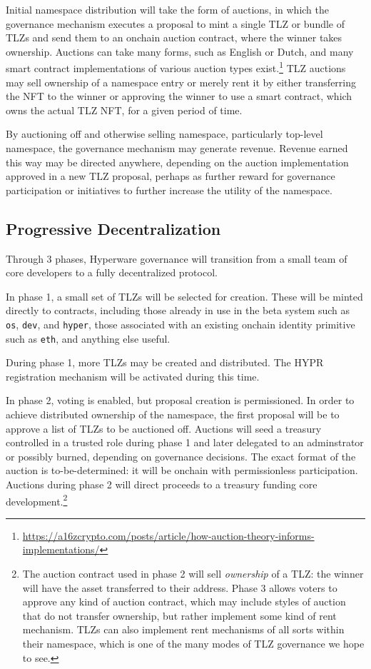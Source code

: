\documentclass[runningheads]{llncs}
\begin{document}
Initial namespace distribution will take the form of auctions, in which the governance mechanism executes a proposal to mint a single TLZ or bundle of TLZs and send them to an onchain auction contract, where the winner takes ownership.
Auctions can take many forms, such as English or Dutch, and many smart contract implementations of various auction types exist.\footnote{\url{https://a16zcrypto.com/posts/article/how-auction-theory-informs-implementations/}}
TLZ auctions may sell ownership of a namespace entry or merely rent it by either transferring the NFT to the winner or approving the winner to use a smart contract, which owns the actual TLZ NFT, for a given period of time.

By auctioning off and otherwise selling namespace, particularly top-level namespace, the governance mechanism may generate revenue.
Revenue earned this way may be directed anywhere, depending on the auction implementation approved in a new TLZ proposal, perhaps as further reward for governance participation or initiatives to further increase the utility of the namespace.

\subsection{Progressive Decentralization}
\label{sec:decentralization}

Through 3 phases, Hyperware governance will transition from a small team of core developers to a fully decentralized protocol.

In phase 1, a small set of TLZs will be selected for creation. These will be minted directly to contracts, including those already in use in the beta system such as \verb|os|, \verb|dev|, and \verb|hyper|, those associated with an existing onchain identity primitive such as \verb|eth|, and anything else useful.

During phase 1, more TLZs may be created and distributed.
The HYPR registration mechanism will be activated during this time.

In phase 2, voting is enabled, but proposal creation is permissioned.
In order to achieve distributed ownership of the namespace, the first proposal will be to approve a list of TLZs to be auctioned off.
Auctions will seed a treasury controlled in a trusted role during phase 1 and later delegated to an adminstrator or possibly burned, depending on governance decisions.
The exact format of the auction is to-be-determined: it will be onchain with permissionless participation.
Auctions during phase 2 will direct proceeds to a treasury funding core development.\footnote{The auction contract used in phase 2 will sell \textit{ownership} of a TLZ: the winner will have the asset transferred to their address.
Phase 3 allows voters to approve any kind of auction contract, which may include styles of auction that do not transfer ownership, but rather implement some kind of rent mechanism.
TLZs can also implement rent mechanisms of all sorts within their namespace, which is one of the many modes of TLZ governance we hope to see.}
\end{document}

